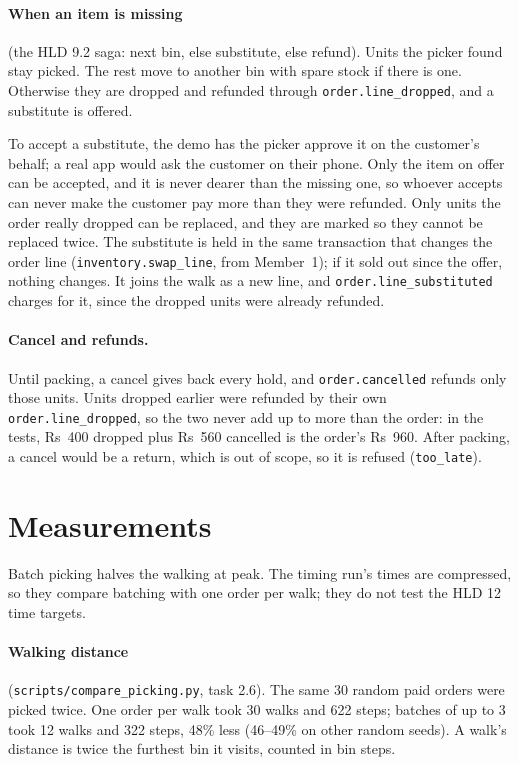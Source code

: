 \paragraph{When an item is missing} (the HLD 9.2 saga: next bin, else substitute, else refund). Units the picker
found stay picked. The rest move to another bin with spare stock if there is one. Otherwise they are dropped and
refunded through \texttt{order.line\_dropped}, and a substitute is offered.

To accept a substitute, the demo has the picker approve it on the customer's behalf; a real app would ask the
customer on their phone. Only the item on offer can be accepted, and it is never dearer than the missing one, so
whoever accepts can never make the customer pay more than they were refunded. Only units the order really dropped
can be replaced, and they are marked so they cannot be
replaced twice. The substitute is held in the same transaction that changes the order line
(\texttt{inventory.swap\_line}, from Member~1); if it sold out since the offer, nothing changes. It joins the walk as
a new line, and \texttt{order.line\_substituted} charges for it, since the dropped units were already refunded.

\paragraph{Cancel and refunds.} Until packing, a cancel gives back every hold, and \texttt{order.cancelled} refunds
only those units. Units dropped earlier were refunded by their own \texttt{order.line\_dropped}, so the two never add up
to more than the order: in the tests, Rs~400 dropped plus Rs~560 cancelled is the order's Rs~960. After packing, a
cancel would be a return, which is out of scope, so it is refused (\texttt{too\_late}).

\section{Measurements}

Batch picking halves the walking at peak. The timing run's times are compressed, so they compare batching with
one order per walk; they do not test the HLD 12 time targets.

\paragraph{Walking distance} (\texttt{scripts/compare\_picking.py}, task 2.6). The same 30 random paid orders were
picked twice. One order per walk took 30 walks and 622 steps; batches of up to 3 took 12 walks and 322 steps, 48\%
less (46--49\% on other random seeds). A walk's distance is twice the furthest bin it visits, counted in bin steps.


